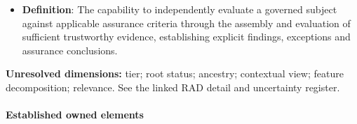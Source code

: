 \begin{itemize}

\item 
\textbf{Definition}: The capability to independently evaluate a governed subject against applicable assurance criteria through the assembly and evaluation of sufficient trustworthy evidence, establishing explicit findings, exceptions and assurance conclusions.



\end{itemize}
\textbf{Unresolved dimensions:} tier; root status; ancestry; contextual view; feature decomposition; relevance. See the linked RAD detail and uncertainty register.

\paragraph*{Established owned elements}
\begingroup\small\setlength{\TableWidth}{\dimexpr\linewidth-6\tabcolsep-4\arrayrulewidth\relax}
